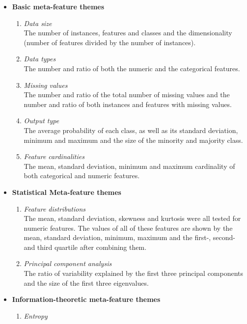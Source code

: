 \documentclass[10pt,a4paper]{article}
\begin{document}
	\begin{itemize}
		\item \textbf{Basic meta-feature themes}\\
		\begin{enumerate}
			\item \textit{Data size} \\
			The number of instances, features and classes and the dimensionality (number of features divided by the number of instances).
			\item \textit{Data types} \\
			The number and ratio of both the numeric and the categorical features.
			\item \textit{Missing values} \\
			The number and ratio of the total number of missing values and the number and ratio of both instances and features with missing values.
			\item \textit{Output type} \\
			The average probability of each class, as well as its standard deviation, minimum and maximum and the size of the minority and majority class.
			\item \textit{Feature cardinalities} \\
			The mean, standard deviation, minimum and maximum cardinality of both categorical and numeric features.
		\end{enumerate}
		\item \textbf{Statistical Meta-feature themes} \\
		\begin{enumerate}
			\item \textit{Feature distributions} \\
			The mean, standard deviation, skewness and kurtosis were all tested for numeric features. The values of all of these features are shown by the mean, standard deviation, minimum, maximum and the first-, second- and third quartile after combining them.   
			\item \textit{Principal component analysis} \\
			The ratio of variability explained by the first three principal components and the size of the first three eigenvalues.
		\end{enumerate}
		\item \textbf{Information-theoretic meta-feature themes} \\ 
		\begin{enumerate}
			\item \textit{Entropy} \\

\end{enumerate}
\end{itemize}
\end{document}
